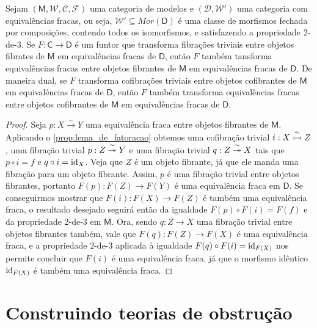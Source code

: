 \begin{corol}
  \label{corol:lema_de_brown}
  Sejam $(\mathsf{M},\mathcal{W},\mathcal{C},\mathcal{F})$ uma categoria de modelos e $(\mathcal{D},\mathcal{W}')$ uma categoria com equivalências fracas, ou seja, $\mathcal{W}' \subseteq Mor(\mathsf{D})$ é uma classe de morfismos fechada por composições, contendo todos os isomorfismos, e satisfazendo a propriedade 2-de-3.
  Se $F: \mathsf{C} \to \mathsf{D}$ é um funtor que transforma fibrações triviais entre objetos fibrates de $\mathsf{M}$ em equivalências fracas de $\mathsf{D}$, então $F$ também tansforma equivalências fracas entre objetos fibrantes de $\mathsf{M}$ em equivalências fracas de $\mathsf{D}$.
  De maneira dual, se $F$ transforma cofibrações triviais entre objetos cofibrantes de $\mathsf{M}$ em equivalências fracas de $\mathsf{D}$, então $F$ também transforma equivalências fracas entre objetos cofibrantes de $\mathsf{M}$ em equivalências fracas de $\mathsf{D}$.
\end{corol}

\begin{proof}
  Seja $p: X \overset{\sim}{\to} Y$ uma equivalência fraca entre objetos fibrantes de $\mathsf{M}$.
  Aplicando o \cref{prop:lema_de_fatoracao} obtemos uma cofibração trivial $i: X \overset{\sim}{\rightarrowtail} Z$, uma fibração trivial $p: Z \overset{\sim}{\twoheadrightarrow} Y$ e uma fibração trivial $q: Z \overset{\sim}{\twoheadrightarrow} X$ tais que $p \circ i = f$ e $q \circ i = \mathrm{id}_{X}$.
  Veja que $Z$ é um objeto fibrante, já que ele manda uma fibração para um objeto fibrante.
  Assim, $p$ é uma fibração trivial entre objetos fibrantes, portanto $F(p): F(Z) \to F(Y)$ é uma equivalência fraca em $\mathsf{D}$.
  Se conseguirmos mostrar que $F(i): F(X) \to F(Z)$ é também uma equivalência fraca, o resultado desejado seguirá então da igualdade $F(p) \circ F(i) = F(f)$ e da propriedade 2-de-3 em $\mathsf{M}$.
  Ora, sendo $q: Z \to X$ uma fibração trivial entre objetos fibrantes também, vale que $F(q): F(Z) \to F(X)$ é uma equivalência fraca, e a propriedade 2-de-3 aplicada à igualdade $F(q) \circ F(i) = \mathrm{id}_{F(X)}$ nos permite concluir que $F(i)$ é uma equivalência fraca, já que o morfismo idêntico $\mathrm{id}_{F(X)}$ é também uma equivalência fraca.
\end{proof}

\section{Construindo teorias de obstrução}


